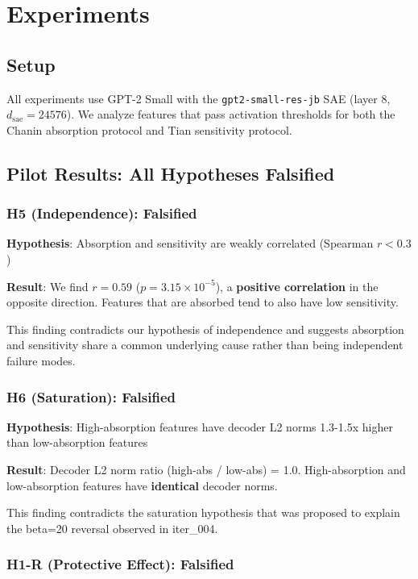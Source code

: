 \documentclass{article}
\begin{document}
\section{Experiments}

\subsection{Setup}

All experiments use GPT-2 Small with the \texttt{gpt2-small-res-jb} SAE (layer 8, $d_{\text{sae}} = 24576$). We analyze features that pass activation thresholds for both the Chanin absorption protocol and Tian sensitivity protocol.

\subsection{Pilot Results: All Hypotheses Falsified}

\subsubsection{H5 (Independence): Falsified}

\textbf{Hypothesis}: Absorption and sensitivity are weakly correlated (Spearman $r < 0.3$)

\textbf{Result}: We find $r = 0.59$ ($p = 3.15 \times 10^{-5}$), a \textbf{positive correlation} in the opposite direction. Features that are absorbed tend to also have low sensitivity.

This finding contradicts our hypothesis of independence and suggests absorption and sensitivity share a common underlying cause rather than being independent failure modes.

\subsubsection{H6 (Saturation): Falsified}

\textbf{Hypothesis}: High-absorption features have decoder L2 norms 1.3-1.5x higher than low-absorption features

\textbf{Result}: Decoder L2 norm ratio (high-abs / low-abs) = 1.0. High-absorption and low-absorption features have \textbf{identical} decoder norms.

This finding contradicts the saturation hypothesis that was proposed to explain the beta=20 reversal observed in iter\_004.

\subsubsection{H1-R (Protective Effect): Falsified}
\end{document}
